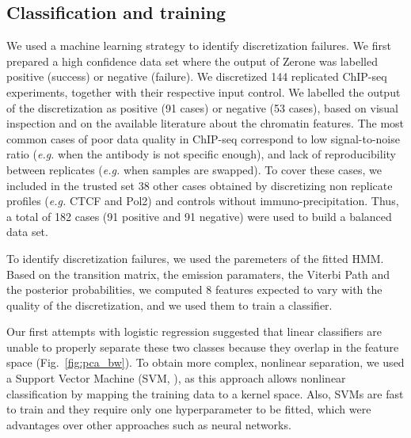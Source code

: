 \documentclass{bioinfo}
\begin{document}
\begin{methods}
\subsection{Classification and training}
\label{sub:training}
We used a machine learning strategy to identify discretization
failures. We first prepared a high confidence data set where the
output of Zerone was labelled positive (success) or negative (failure).
We discretized 144 replicated ChIP-seq experiments, together with their
respective input control.
We labelled the output of the discretization as positive (91 cases)
or negative (53 cases), based on visual inspection and on the available
literature about the chromatin features. The most common cases of
poor data quality in ChIP-seq correspond to low signal-to-noise ratio
(\textit{e.g.} when the antibody is not specific enough), and lack of
reproducibility between replicates (\textit{e.g.} when samples are
swapped). To cover these cases, we included in the trusted set
38 other cases obtained by discretizing non replicate profiles
(\textit{e.g.} CTCF and Pol2) and controls without immuno-precipitation.
Thus, a total of 182 cases (91 positive and 91 negative) were used to
build a balanced data set.

To identify discretization failures, we used the paremeters of the
fitted HMM. Based on the transition matrix, the emission paramaters,
the Viterbi Path and the posterior probabilities,
we computed 8 features expected to vary with the quality
of the discretization, and we used them to train a classifier.

Our first attempts with logistic regression suggested that linear
classifiers are unable to properly separate these two classes because
they overlap in the feature space (Fig.~\ref{fig:pca_bw}). To obtain more
complex, nonlinear separation, we used a Support Vector Machine
(SVM, \citealp{Chang2011,e1071}), as this approach
allows nonlinear classification by mapping
the training data to a kernel space. Also, SVMs are fast to train and
they require only one hyperparameter to be fitted, which were
advantages over other approaches such as neural networks.


\end{methods}
\end{document}
